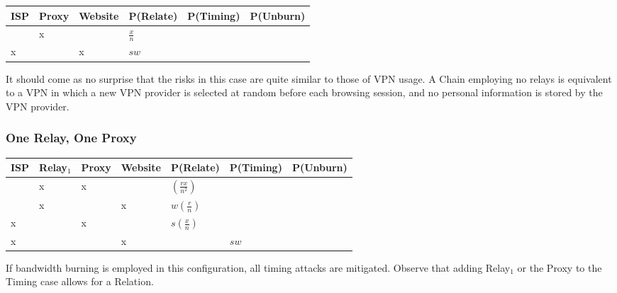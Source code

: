 
\begin{center}
\begin{tabular}{l | l | l | l | l | l}
  ISP & Proxy & Website & P(Relate)          & P(Timing) & P(Unburn) \\
  \hline
      & x     &         & $\frac{x}{n}$      & & \\
  \hline
  x   &       & x       & $sw$               & & \\
\end{tabular}
\end{center}

It should come as no surprise that the risks in this case are quite
similar to those of VPN usage. A Chain employing no relays is
equivalent to a VPN in which a new VPN provider is selected at random
before each browsing session, and no personal information is stored by
the VPN provider.

\subsubsection*{One Relay, One Proxy}


\begin{center}
\begin{tabular}{l | l | l | l | l | l | l}
  ISP & Relay$_1$ & Proxy & Website & P(Relate)          & P(Timing) & P(Unburn) \\
  \hline
      & x         & x     &         & $(\frac{rx}{n^2})$ & & \\
  \hline
      & x         &       & x       & $w(\frac{r}{n})$   & & \\
  \hline
  x   &           & x     &         & $s(\frac{x}{n})$   & & \\
  \hline
  x   &           &       & x       &                    & $sw$ & \\
\end{tabular}
\end{center}

If bandwidth burning is employed in this configuration, all timing
attacks are mitigated. Observe that adding Relay$_1$ or the Proxy to
the Timing case allows for a Relation.

